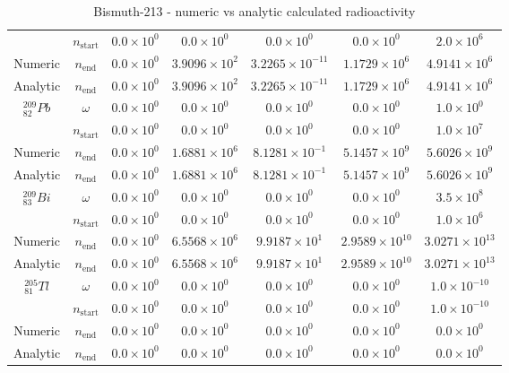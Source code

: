\begin{table}[h]
\begin{center}
\begin{longtable}{c c c c c c c}
 & $n_{\text{start}}$ & 
${0.0} \times 10^{0}$ & ${0.0} \times 10^{0}$ & ${0.0} \times 10^{0}$ &
${0.0} \times 10^{0}$ & ${2.0} \times 10^{6}$ \\
Numeric & $n_{\text{end}}$ & 
${0.0} \times 10^{0}$ & ${3.9096} \times 10^{2}$ & ${3.2265} \times 10^{-11}$ & 
${1.1729} \times 10^{6}$ & ${4.9141} \times 10^{6}$ \\
Analytic & $n_{\text{end}}$ & 
${0.0} \times 10^{0}$ & ${3.9096} \times 10^{2}$ & ${3.2265} \times 10^{-11}$ & 
${1.1729} \times 10^{6}$ & ${4.9141} \times 10^{6}$ \\
\hline
${}^{209}_{82}Pb$ & $\omega$ & 
${0.0} \times 10^{0}$ & ${0.0} \times 10^{0}$ & ${0.0} \times 10^{0}$ &
${0.0} \times 10^{0}$ & ${1.0} \times 10^{0}$ \\
 & $n_{\text{start}}$ & 
${0.0} \times 10^{0}$ & ${0.0} \times 10^{0}$ & ${0.0} \times 10^{0}$ &
${0.0} \times 10^{0}$ & ${1.0} \times 10^{7}$ \\
Numeric & $n_{\text{end}}$ & 
${0.0} \times 10^{0}$ & ${1.6881} \times 10^{6}$ & ${8.1281} \times 10^{-1}$ & 
${5.1457} \times 10^{9}$ & ${5.6026} \times 10^{9}$ \\
Analytic & $n_{\text{end}}$ & 
${0.0} \times 10^{0}$ & ${1.6881} \times 10^{6}$ & ${8.1281} \times 10^{-1}$ & 
${5.1457} \times 10^{9}$ & ${5.6026} \times 10^{9}$ \\
\hline
${}^{209}_{83}Bi$ & $\omega$ & 
${0.0} \times 10^{0}$ & ${0.0} \times 10^{0}$ & ${0.0} \times 10^{0}$ &
${0.0} \times 10^{0}$ & ${3.5} \times 10^{8}$ \\
 & $n_{\text{start}}$ & 
${0.0} \times 10^{0}$ & ${0.0} \times 10^{0}$ & ${0.0} \times 10^{0}$ &
${0.0} \times 10^{0}$ & ${1.0} \times 10^{6}$ \\
Numeric & $n_{\text{end}}$ & 
${0.0} \times 10^{0}$ & ${6.5568} \times 10^{6}$ & ${9.9187} \times 10^{1}$ & 
${2.9589} \times 10^{10}$ & ${3.0271} \times 10^{13}$ \\
Analytic & $n_{\text{end}}$ & 
${0.0} \times 10^{0}$ & ${6.5568} \times 10^{6}$ & ${9.9187} \times 10^{1}$ & 
${2.9589} \times 10^{10}$ & ${3.0271} \times 10^{13}$ \\
\hline
${}^{205}_{81}Tl$ & $\omega$ & 
${0.0} \times 10^{0}$ & ${0.0} \times 10^{0}$ & ${0.0} \times 10^{0}$ &
${0.0} \times 10^{0}$ & ${1.0} \times 10^{-10}$ \\
 & $n_{\text{start}}$ & 
${0.0} \times 10^{0}$ & ${0.0} \times 10^{0}$ & ${0.0} \times 10^{0}$ &
${0.0} \times 10^{0}$ & ${1.0} \times 10^{-10}$ \\
Numeric & $n_{\text{end}}$ & 
${0.0} \times 10^{0}$ & ${0.0} \times 10^{0}$ & ${0.0} \times 10^{0}$ & 
${0.0} \times 10^{0}$ & ${0.0} \times 10^{0}$ \\
Analytic & $n_{\text{end}}$ & 
${0.0} \times 10^{0}$ & ${0.0} \times 10^{0}$ & ${0.0} \times 10^{0}$ & 
${0.0} \times 10^{0}$ & ${0.0} \times 10^{0}$ \\
\hline\hline
\end{longtable}
\end{center}
\caption{Bismuth-213 - numeric vs analytic calculated radioactivity}
\label{table:bi213trialdata}
\end{table}




